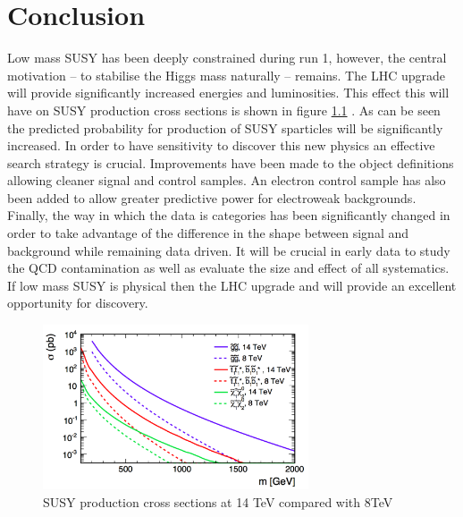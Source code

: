 
\chapter{Conclusion} %

\label{Chapter7} %



Low mass SUSY has been deeply constrained during run 1, however, 
the central motivation -- to stabilise the Higgs mass naturally -- remains. 
The LHC upgrade will provide significantly increased energies and luminosities. 
This effect this will have on SUSY production cross sections is shown 
in figure \ref{snow} \cite{ProjectedCx}. As can be seen the predicted 
probability for production of SUSY sparticles will be significantly 
increased. In order to have sensitivity to discover this new physics 
an effective search strategy is crucial. Improvements have been 
made to the object definitions allowing cleaner signal and control
samples. An electron control sample has also been added to allow
greater predictive power for electroweak backgrounds. Finally, the way in which
the data is categories has been significantly changed in order to take
advantage of the difference in the \mht shape between signal and
background while remaining data driven. It will be crucial in early data to study the QCD contamination as well as evaluate the size and effect of all systematics. If low mass SUSY is physical then 
the LHC upgrade and \alphat will provide an excellent opportunity for discovery. 

\begin{figure}
\centering
    \includegraphics[width=0.7\textwidth]{Figures/snowmass.png}
  \caption{SUSY production cross sections at 14 TeV compared with 8TeV}
  \label{snow}
\end{figure}


